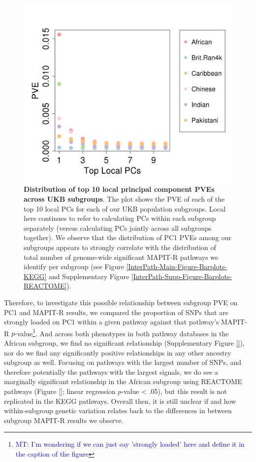 \documentclass[12pt,a4paper]{article}
\begin{document}
\begin{figure}[htb]
\centering
\includegraphics[scale=.5]{Images/Main/InterPath_Main_Figure_Eigenvalues_vs2.png}
\caption[TBD]{\textbf{Distribution of top 10 local principal component PVEs across UKB subgroups}. The plot shows the PVE of each of the top 10 local PCs for each of our UKB population subgroups. Local here continues to refer to calculating PCs within each subgroup separately (versus calculating PCs jointly across all subgroups together). We observe that the distribution of PC1 PVEs among our subgroups appears to strongly correlate with the distribution of total number of genome-wide significant MAPIT-R pathways we identify per subgroup (see Figure \ref{InterPath-Main-Figure-Barplots-KEGG} and  Supplementary Figure \ref{InterPath-Supp-Figure-Barplots-REACTOME}).}
\label{InterPath-Main-Figure-Eigenvalues}
\end{figure}

Therefore, to investigate this possible relationship between subgroup PVE on PC1 and MAPIT-R results, we compared the proportion of SNPs that are strongly loaded on PC1 within a given pathway against that pathway's MAPIT-R $p$-value\footnote{\textcolor{blue}{MT: I'm wondering if we can just say 'strongly loaded' here and define it in the caption of the figure}}. And across both phenotypes in both pathway databases in the African subgroup, we find no significant relationship (Supplementary Figure \ref{}), nor do we find any significantly positive relationships in any other ancestry subgroup as well. Focusing on pathways with the largest number of SNPs, and therefore potentially the pathways with the largest signals, we do see a marginally significant relationship in the African subgroup using REACTOME pathways (Figure \ref{}; linear regression $p$-value < .05), but this result is not replicated in the KEGG pathways. Overall then, it is still unclear if and how within-subgroup genetic variation relates back to the differences in between subgroup MAPIT-R results we observe.
\end{document}
